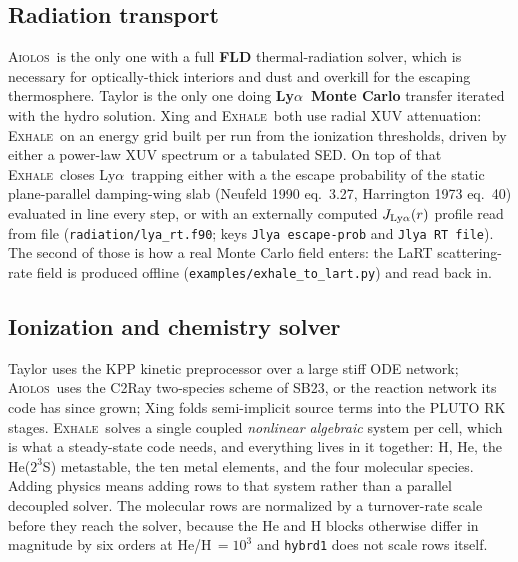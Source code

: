 \documentclass[english,a4paper]{my_memo}
\newcommand{\EXHALE}{\textsc{Exhale}}
\newcommand{\AIOLOS}{\textsc{Aiolos}}
\newcommand{\Lya}{Ly$\alpha$}
\begin{document}
\subsection{Radiation transport}
\AIOLOS\ is the only one with a full \textbf{FLD} thermal-radiation solver,
which is necessary for optically-thick interiors and dust and overkill for the
escaping thermosphere. Taylor is the only one doing \textbf{\Lya\ Monte Carlo}
transfer iterated with the hydro solution. Xing and \EXHALE\ both use radial
XUV attenuation: \EXHALE\ on an energy grid built per run from the
ionization thresholds, driven by either a power-law XUV spectrum or a
tabulated SED. On top of that \EXHALE\ closes \Lya\ trapping either with a
the escape probability of the static plane-parallel damping-wing slab
(Neufeld 1990 eq.~3.27, Harrington 1973 eq.~40) evaluated in line every step, or
with an externally computed $J_{\rm Ly\alpha}(r)$ profile read from file
(\texttt{radiation/lya\_rt.f90}; keys \texttt{Jlya escape-prob} and
\texttt{Jlya RT file}). The second of those is how a real Monte Carlo field
enters: the LaRT scattering-rate field is produced offline
(\texttt{examples/exhale\_to\_lart.py}) and read back in.

\subsection{Ionization and chemistry solver}
\label{sec:chemsolver}
Taylor uses the KPP kinetic preprocessor over a large stiff ODE network;
\AIOLOS\ uses the C2Ray two-species scheme of SB23, or the reaction network
its code has since grown; Xing folds
semi-implicit source terms into the PLUTO RK stages. \EXHALE\ solves a single
coupled \emph{nonlinear algebraic} system per cell, which is what a steady-state
code needs, and everything lives in it together: H, He, the He($2^3$S)
metastable, the ten metal elements, and the four molecular species. Adding
physics means adding rows to that system rather than a parallel decoupled
solver. The molecular rows are normalized by a turnover-rate scale before they
reach the solver, because the He and H blocks otherwise differ in magnitude by
six orders at He/H\,$=10^3$ and \texttt{hybrd1} does not scale rows itself.
\end{document}
